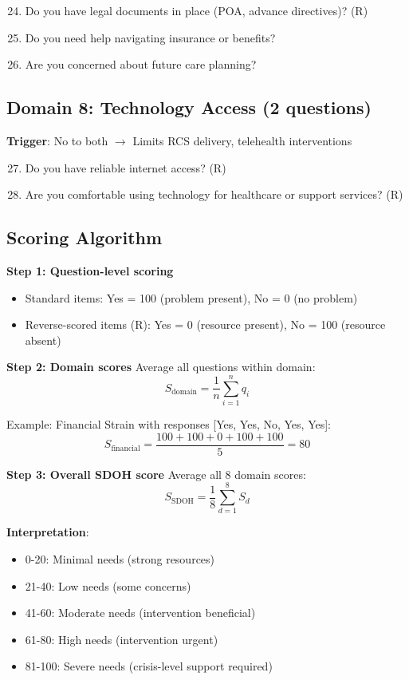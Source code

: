 \documentclass{article}
\begin{document}
\begin{enumerate}
    \setcounter{enumi}{23}
    \item Do you have legal documents in place (POA, advance directives)? (R)
    \item Do you need help navigating insurance or benefits?
    \item Are you concerned about future care planning?
\end{enumerate}

\subsection*{Domain 8: Technology Access (2 questions)}
\textbf{Trigger}: No to both $\rightarrow$ Limits RCS delivery, telehealth interventions

\begin{enumerate}
    \setcounter{enumi}{26}
    \item Do you have reliable internet access? (R)
    \item Are you comfortable using technology for healthcare or support services? (R)
\end{enumerate}

\subsection*{Scoring Algorithm}

\textbf{Step 1: Question-level scoring}
\begin{itemize}
    \item Standard items: Yes = 100 (problem present), No = 0 (no problem)
    \item Reverse-scored items (R): Yes = 0 (resource present), No = 100 (resource absent)
\end{itemize}

\textbf{Step 2: Domain scores}  
Average all questions within domain:
$$S_{\text{domain}} = \frac{1}{n} \sum_{i=1}^{n} q_i$$

Example: Financial Strain with responses [Yes, Yes, No, Yes, Yes]:
$$S_{\text{financial}} = \frac{100 + 100 + 0 + 100 + 100}{5} = 80$$

\textbf{Step 3: Overall SDOH score}  
Average all 8 domain scores:
$$S_{\text{SDOH}} = \frac{1}{8} \sum_{d=1}^{8} S_{d}$$

\textbf{Interpretation}:
\begin{itemize}
    \item 0-20: Minimal needs (strong resources)
    \item 21-40: Low needs (some concerns)
    \item 41-60: Moderate needs (intervention beneficial)
    \item 61-80: High needs (intervention urgent)
    \item 81-100: Severe needs (crisis-level support required)
\end{itemize}
\end{document}
